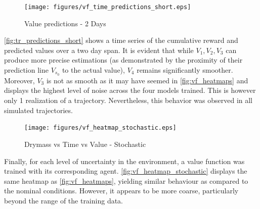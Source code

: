 \begin{figure}[H]
	\centering
	\texttt{[image: figures/vf\_time\_predictions\_short.eps]}
	\caption{Value predictions - 2 Days}
	\label{fig:tr_predictions_short}
\end{figure}

\autoref{fig:tr_predictions_short} shows a time series of the cumulative reward and predicted values over a two day span. It is evident that while $V_1, V_2, V_3$ can produce more precise estimations (as demonstrated by the proximity of their prediction line $V_{s_0}$ to the actual value), $V_4$ remains significantly smoother. Moreover, $V_3$ is not as smooth as it may have seemed in \autoref{fig:vf_heatmaps} and displays the highest level of noise across the four models trained. This is however only 1 realization of a trajectory. Nevertheless, this behavior was observed in all simulated trajectories.

\begin{figure}[H]
	\centering
	\texttt{[image: figures/vf\_heatmap\_stochastic.eps]}
	\caption{Drymass vs Time vs Value - Stochastic}
	\label{fig:vf_heatmap_stochastic}
\end{figure}
Finally, for each level of uncertainty in the environment, a value function was trained with its corresponding agent. \autoref{fig:vf_heatmap_stochastic} displays the same heatmap as \autoref{fig:vf_heatmaps}, yielding similar behaviour as compared to the nominal conditions. However, it appears to be more coarse, particularly beyond the range of the training data.


